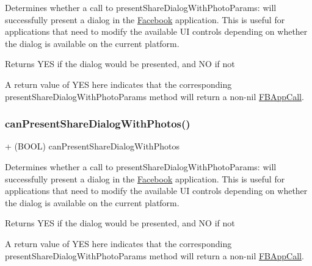 Determines whether a call to present\+Share\+Dialog\+With\+Photo\+Params\+: will successfully present a dialog in the \hyperlink{interfaceFacebook}{Facebook} application. This is useful for applications that need to modify the available UI controls depending on whether the dialog is available on the current platform.

\begin{DoxyReturn}{Returns}
Y\+ES if the dialog would be presented, and NO if not
\end{DoxyReturn}
A return value of Y\+ES here indicates that the corresponding present\+Share\+Dialog\+With\+Photo\+Params method will return a non-\/nil \hyperlink{interfaceFBAppCall}{F\+B\+App\+Call}. \mbox{\label{interfaceFBDialogs_a16156d6a4664e4ea55e351bc78b6e8a7}} 
\subsubsection{\texorpdfstring{can\+Present\+Share\+Dialog\+With\+Photos()}{canPresentShareDialogWithPhotos()}\hspace{0.1cm}{\footnotesize\ttfamily [2/5]}}
{\footnotesize\ttfamily + (B\+O\+OL) can\+Present\+Share\+Dialog\+With\+Photos \begin{DoxyParamCaption}{ }\end{DoxyParamCaption}}

Determines whether a call to present\+Share\+Dialog\+With\+Photo\+Params\+: will successfully present a dialog in the \hyperlink{interfaceFacebook}{Facebook} application. This is useful for applications that need to modify the available UI controls depending on whether the dialog is available on the current platform.

\begin{DoxyReturn}{Returns}
Y\+ES if the dialog would be presented, and NO if not
\end{DoxyReturn}
A return value of Y\+ES here indicates that the corresponding present\+Share\+Dialog\+With\+Photo\+Params method will return a non-\/nil \hyperlink{interfaceFBAppCall}{F\+B\+App\+Call}. \mbox{\label{interfaceFBDialogs_a16156d6a4664e4ea55e351bc78b6e8a7}} 
